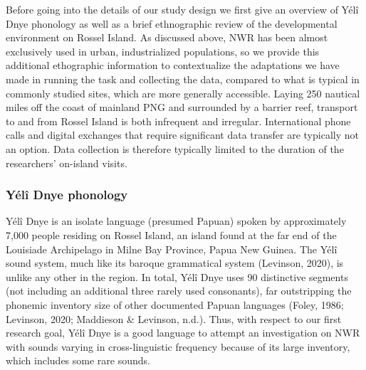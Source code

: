 \documentclass[english,,man,floatsintext]{apa6}
\begin{document}
Before going into the details of our study design we first give an overview of Yélî Dnye phonology as well as a brief ethnographic review of the developmental environment on Rossel Island. As discussed above, NWR has been almost exclusively used in urban, industrialized populations, so we provide this additional ethographic information to contextualize the adaptations we have made in running the task and collecting the data, compared to what is typical in commonly studied sites, which are more generally accessible. Laying 250 nautical miles off the coast of mainland PNG and surrounded by a barrier reef, transport to and from Rossel Island is both infrequent and irregular. International phone calls and digital exchanges that require significant data transfer are typically not an option. Data collection is therefore typically limited to the duration of the researchers' on-island visits.

\hypertarget{yuxe9luxee-dnye-phonology}{%
\subsubsection{Yélî Dnye phonology}\label{yuxe9luxee-dnye-phonology}}

Yélî Dnye is an isolate language (presumed Papuan) spoken by approximately 7,000 people residing on Rossel Island, an island found at the far end of the Louisiade Archipelago in Milne Bay Province, Papua New Guinea. The Yélî sound system, much like its baroque grammatical system (Levinson, 2020), is unlike any other in the region. In total, Yélî Dnye uses 90 distinctive segments (not including an additional three rarely used consonants), far outstripping the phonemic inventory size of other documented Papuan languages (Foley, 1986; Levinson, 2020; Maddieson \& Levinson, n.d.). Thus, with respect to our first research goal, Yélî Dnye is a good language to attempt an investigation on NWR with sounds varying in cross-linguistic frequency because of its large inventory, which includes some rare sounds.
\end{document}
